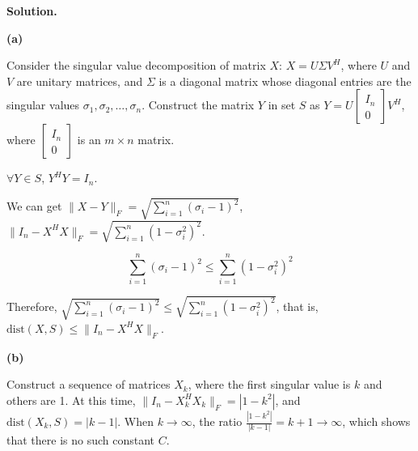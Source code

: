 \documentclass[12pt, a4paper, oneside]{ctexart}
\newenvironment{solution}{\par\noindent\textbf{Solution. }}{\par}
\begin{document}
\begin{solution}


\textbf{(a)} 

Consider the singular value decomposition of matrix $ X $: $ X = U\Sigma V^H $, where $ U $ and $ V $ are unitary matrices, and $ \Sigma $ is a diagonal matrix whose diagonal entries are the singular values $ \sigma_1, \sigma_2, \ldots, \sigma_n $. Construct the matrix $ Y $ in set $ S $ as $ Y = U\begin{bmatrix}I_n\\0\end{bmatrix}V^H $, where $ \begin{bmatrix}I_n\\0\end{bmatrix} $ is an $ m\times n $ matrix.

$ \forall Y\in S $, $ Y^H Y = I_n $.

We can get $ \|X - Y\|_F=\sqrt{\sum_{i = 1}^n(\sigma_i - 1)^2} $, $ \|I_n - X^H X\|_F = \sqrt{\sum_{i = 1}^n(1 - \sigma_i^2)^2} $.

$$
\sum_{i = 1}^n(\sigma_i - 1)^2\leq\sum_{i = 1}^n(1 - \sigma_i^2)^2
$$

Therefore, $ \sqrt{\sum_{i = 1}^n(\sigma_i - 1)^2}\leq\sqrt{\sum_{i = 1}^n(1 - \sigma_i^2)^2} $, that is, $ \text{dist}(X, S)\leq\|I_n - X^H X\|_F $.

\vspace{12pt}

\textbf{(b)} 

Construct a sequence of matrices $ X_k $, where the first singular value is $ k $ and others are 1. At this time, $ \|I_n - X_k^H X_k\|_F = |1 - k^2| $, and $ \text{dist}(X_k, S)=|k - 1| $. When $ k\to\infty $, the ratio $ \frac{|1 - k^2|}{|k - 1|}=k + 1\to\infty $, which shows that there is no such constant $ C $.

\end{solution}
\end{document}
